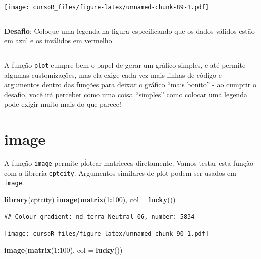 \documentclass[]{book}
\newenvironment{Shaded}{\begin{snugshade}}{\end{snugshade}}
\newcommand{\KeywordTok}[1]{\textcolor[rgb]{0.13,0.29,0.53}{\textbf{#1}}}
\newcommand{\DataTypeTok}[1]{\textcolor[rgb]{0.13,0.29,0.53}{#1}}
\newcommand{\DecValTok}[1]{\textcolor[rgb]{0.00,0.00,0.81}{#1}}
\newcommand{\OperatorTok}[1]{\textcolor[rgb]{0.81,0.36,0.00}{\textbf{#1}}}
\newcommand{\NormalTok}[1]{#1}
\theoremstyle{definition}
\theoremstyle{definition}
\theoremstyle{definition}
\theoremstyle{remark}
\begin{document}
\texttt{[image: cursoR\_files/figure-latex/unnamed-chunk-89-1.pdf]}

\begin{center}\rule{0.5\linewidth}{\linethickness}\end{center}

{\textbf{Desafio}: Coloque uma legenda na figura especificando que os
dados válidos estão em azul e os inválidos em vermelho }

\begin{center}\rule{0.5\linewidth}{\linethickness}\end{center}

A função \texttt{plot} cumpre bem o papel de gerar um gráfico simples, e
até permite algumas customizações, mas ela exige cada vez mais linhas de
código e argumentos dentro das funções para deixar o gráfico ``mais
bonito'' - ao cumprir o desafio, você irá perceber como uma coisa
``simples'' como colocar uma legenda pode exigir muito mais do que
parece!

\section{image}\label{image}

A função \texttt{image} permite pĺotear matrieces diretamente. Vamos
testar esta função com a librería \texttt{cptcity}. Argumentos similares
de plot podem ser usados em \texttt{image}.

\begin{Shaded}
\begin{Highlighting}[]
\KeywordTok{library}\NormalTok{(cptcity)}
\KeywordTok{image}\NormalTok{(}\KeywordTok{matrix}\NormalTok{(}\DecValTok{1}\OperatorTok{:}\DecValTok{100}\NormalTok{), }\DataTypeTok{col =} \KeywordTok{lucky}\NormalTok{())}
\end{Highlighting}
\end{Shaded}

\begin{verbatim}
## Colour gradient: nd_terra_Neutral_06, number: 5834
\end{verbatim}

\texttt{[image: cursoR\_files/figure-latex/unnamed-chunk-90-1.pdf]}

\begin{Shaded}
\begin{Highlighting}[]
\KeywordTok{image}\NormalTok{(}\KeywordTok{matrix}\NormalTok{(}\DecValTok{1}\OperatorTok{:}\DecValTok{100}\NormalTok{), }\DataTypeTok{col =} \KeywordTok{lucky}\NormalTok{())}
\end{Highlighting}
\end{Shaded}
\end{document}

